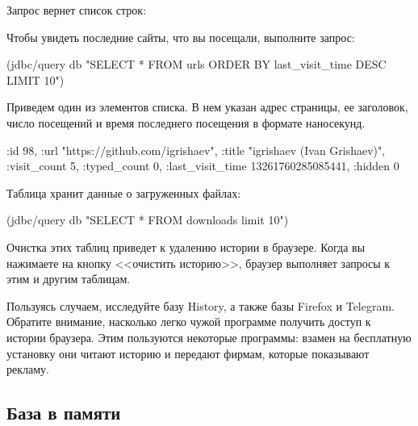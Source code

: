 Запрос вернет список строк:

\begin{english}
  \begin{clojure}
  \end{clojure}
\end{english}

Чтобы увидеть последние сайты, что вы посещали, выполните запрос:

\begin{english}
  \begin{clojure}
(jdbc/query db
  "SELECT * FROM urls
   ORDER BY last_visit_time DESC LIMIT 10")
  \end{clojure}
\end{english}

Приведем один из элементов списка. В нем указан адрес страницы, ее заголовок, число посещений и время последнего посещения в формате наносекунд.

\begin{english}
  \begin{clojure}
{:id 98,
 :url "https://github.com/igrishaev",
 :title "igrishaev (Ivan Grishaev)",
 :visit_count 5,
 :typed_count 0,
 :last_visit_time 13261760285085441,
 :hidden 0}
  \end{clojure}
\end{english}

Таблица  хранит данные о загруженных файлах:

\begin{english}
  \begin{clojure}
(jdbc/query db "SELECT * FROM downloads limit 10")
  \end{clojure}
\end{english}

Очистка этих таблиц приведет к удалению истории в браузере. Когда вы нажимаете на кнопку <<очистить историю>>, браузер выполняет запросы  к этим и другим таблицам.

Пользуясь случаем, исследуйте базу History, а также базы Firefox и Telegram. Обратите внимание, насколько легко чужой программе получить доступ к истории браузера. Этим пользуются некоторые программы: взамен на бесплатную установку они читают историю и передают фирмам, которые показывают рекламу.

\subsection{База в памяти}

